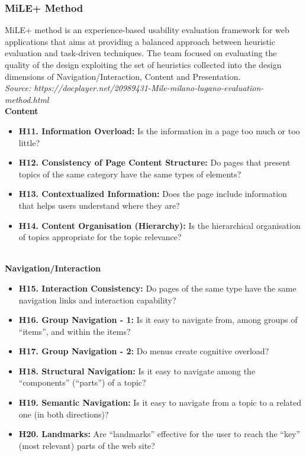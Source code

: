 \subsubsection{MiLE+ Method}
MiLE+ method is an experience-based usability evaluation framework for web applications that aims at providing a balanced approach between heuristic evaluation and task-driven techniques. The team focused on evaluating the quality of the design exploiting the set of heuristics collected into the design dimensions of Navigation/Interaction, Content and Presentation.\\
\textit{Source: https://docplayer.net/20989431-Mile-milano-lugano-evaluation-method.html}\\

\textbf{Content}
\begin{itemize}
    \item \textbf{H11. Information Overload:} Is the information in a page too much or too little?
    \item \textbf{H12. Consistency of Page Content Structure:} Do pages that present topics of the same category have the same types of elements?
    \item \textbf{H13. Contextualized Information:} Does the page include information that helps users understand where they are?
    \item \textbf{H14. Content Organisation (Hierarchy):} Is the hierarchical organisation of topics appropriate for the topic relevance?
\end{itemize}

\\

\textbf{Navigation/Interaction}
\begin{itemize}
    \item \textbf{H15.  Interaction Consistency:} Do pages of the same type have the same navigation links and interaction capability?
    \item \textbf{H16.  Group Navigation - 1:} Is it easy to navigate from, among groups of “items”, and within the items?
    \item \textbf{H17.  Group Navigation - 2:} Do menus create cognitive overload?
    \item \textbf{H18.  Structural Navigation:} Is it easy to navigate among the “components” (“parts”) of a topic?
    \item \textbf{H19.  Semantic Navigation:} Is it easy to navigate from a topic to a related one (in both directions)?
    \item \textbf{H20.  Landmarks:} Are “landmarks” effective for the user to reach the “key” (most relevant) parts of the web site?
\end{itemize}

